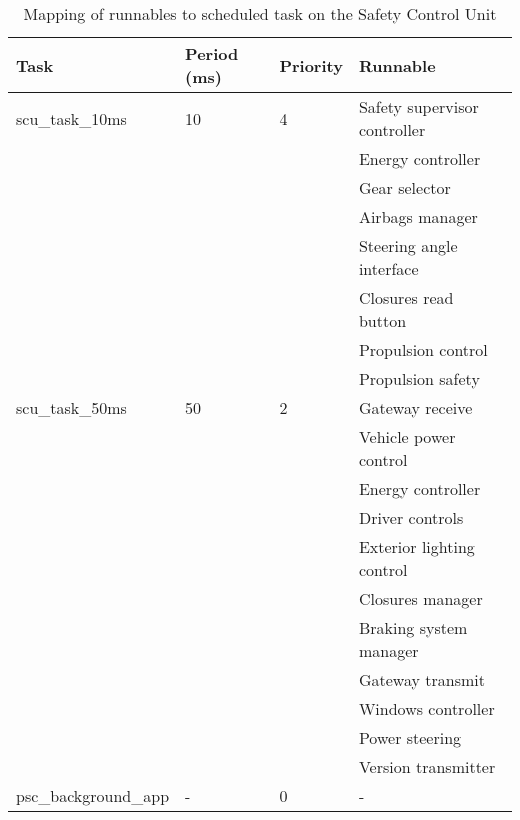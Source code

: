 \begin{table}[htb]
    \centering
\begin{tabular}{@{}llll@{}}
    \toprule
    Task                           & Period (ms) & Priority & Runnable                     \\ \midrule
    scu\_task\_10ms                & 10          & 4        & Safety supervisor controller \\
                                   &             &          & Energy controller            \\
                                   &             &          & Gear selector                \\
                                   &             &          & Airbags manager              \\
                                   &             &          & Steering angle interface     \\
                                   &             &          & Closures read button         \\
                                   &             &          & Propulsion control           \\
                                   &             &          & Propulsion safety            \\
    scu\_task\_50ms                & 50          & 2        & Gateway receive              \\
                                   &             &          & Vehicle power control        \\
                                   &             &          & Energy controller            \\
                                   &             &          & Driver controls              \\
                                   &             &          & Exterior lighting control    \\
                                   &             &          & Closures manager             \\
                                   &             &          & Braking system manager       \\
                                   &             &          & Gateway transmit             \\
                                   &             &          & Windows controller           \\
                                   &             &          & Power steering               \\
                                   &             &          & Version transmitter          \\
    psc\_background\_app           & -           & 0        & -                            \\ \bottomrule
\end{tabular}
\caption{Mapping of runnables to scheduled task on the Safety Control Unit}
\label{tab:runnable_mapping_scu}
\end{table}
